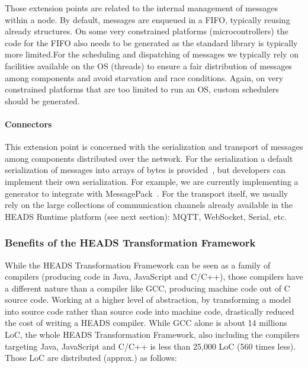 Those extension points are related to the internal management of messages within a node. By default, messages are enqueued in a FIFO, typically reusing already structures. On some very constrained platforms (microcontrollers) the code for the FIFO also needs to be generated as the standard library is typically more limited.For the scheduling and dispatching of messages we typically rely on facilities available on the OS (threads) to ensure a fair distribution of messages among components and avoid starvation and race conditions. Again, on very constrained platforms that are too limited to run an OS, custom schedulers should be generated.

\paragraph{Connectors}

This extension point is concerned with the serialization and transport of messages among components distributed over the network. For the serialization a default serialization of messages into arrays of bytes is provided~\cite{DBLP:conf/models/FleureyMSB11}, but developers can implement their own serialization. For example, we are currently implementing a generator to integrate with MessagePack~\cite{furuhashimessagepack}. For the transport itself, we usually rely on the large collections of communication channels already available in the HEADS Runtime platform (see next section): MQTT, WebSocket, Serial, etc. 

\subsubsection{Benefits of the HEADS Transformation Framework}
While the HEADS Transformation Framework can be seen as a family of compilers (producing code in Java, JavaScript and C/C++), those compilers have a different nature than a compiler like GCC, producing machine code out of C source code. Working at a higher level of abstraction, by transforming a model into source code rather than source code into machine code, drastically reduced the cost of writing a HEADS compiler. While GCC alone is about 14 millions LoC, the whole HEADS Transformation Framework, also including the compilers targeting Java, JavaScript and C/C++ is less than 25,000 LoC (560 times less). Those LoC are distributed (approx.) as follows:

